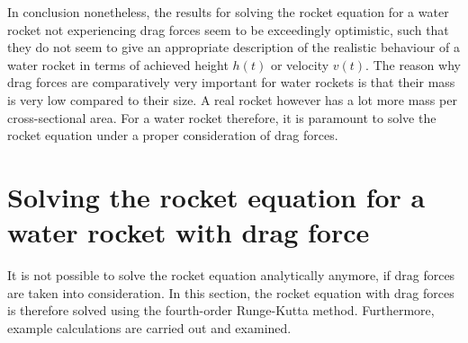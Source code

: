 \documentclass[a4paper,11pt]{report}
\begin{document}
In conclusion nonetheless, the results for solving the rocket equation for a water rocket not experiencing drag forces seem to be exceedingly optimistic, such that they do not seem to give an appropriate description of the realistic behaviour of a water rocket in terms of achieved height $h(t)$ or velocity $v(t)$. The reason why drag forces are comparatively very important for water rockets is that their mass is very low compared to their size. A real rocket however has a lot more mass per cross-sectional area. For a water rocket therefore, it is paramount to solve the rocket equation under a proper consideration of drag forces.

\section{Solving the rocket equation for a water rocket with drag force}
It is not possible to solve the rocket equation analytically anymore, if drag forces are taken into consideration. In this section, the rocket equation with drag forces is therefore solved using the fourth-order Runge-Kutta method. Furthermore, example calculations are carried out and examined.
\end{document}
